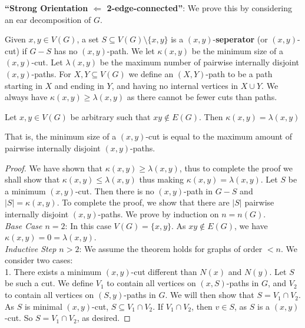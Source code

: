 \textbf{``Strong Orientation \(\Leftarrow\) 2-edge-connected''}: We prove this by considering an ear decomposition of $G$.

Given $x, y \in V(G)$, a set $S \subseteq V(G) \setminus \{x,y\}$ is a $(x,y)$-\textbf{seperator} (or $(x,y)$-cut) if $G-S$ has no $(x,y)$-path. We let $\kappa(x,y)$ be the minimum size of a $(x,y)$-cut. Let \(\lambda(x,y)\) be the maximum number of pairwise internally disjoint $(x,y)$-paths. For $X, Y \subseteq V(G)$ we define an $(X,Y)$-path to be a path starting in $X$ and ending in $Y$, and having no internal vertices in $X \cup Y$. We always have \(\kappa(x,y) \ge \lambda(x,y)\) as there cannot be fewer cuts than paths.

\begin{theorem}[Menger, 1927]
	Let $x,y \in V(G)$ be arbitrary such that $xy \notin E(G)$. Then \(\kappa(x,y) = \lambda(x,y)\)
\end{theorem}

That is, the minimum size of a $(x,y)$-cut is equal to the maximum amount of pairwise internally disjoint $(x,y)$-paths.

\begin{proof}
	We have shown that \(\kappa(x,y) \ge \lambda(x,y)\), thus to complete the proof we shall show that $\kappa(x,y) \le \lambda(x,y)$ thus making \(\kappa(x,y) = \lambda(x,y)\). Let $S$ be a minimum $(x,y)$-cut. Then there is no $(x,y)$-path in $G-S$ and $|S| = \kappa(x,y)$. To complete the proof, we show that there are $|S|$ pairwise internally disjoint $(x,y)$-paths. We prove by induction on $n = n(G)$.\\
	\noindent
	\textit{Base Case $n = 2$}: In this case $V(G) = \{x,y\}$. As $xy \notin E(G)$, we have $\kappa(x,y) = 0 = \lambda(x,y)$.\\
	\noindent
	\textit{Inductive Step $n > 2$}: We assume the theorem holds for graphs of order $< n$. We consider two cases:\\
	1. There exists  a minimum $(x,y)$-cut different than $N(x)$ and $N(y)$. Let $S$ be such a cut. We define $V_{1}$ to contain all vertices on $(x,S)$-paths in $G$, and $V_{2}$ to contain all vertices on $(S,y)$-paths in $G$. We will then show that $S = V_{1} \cap V_{2}$. As $S$ is minimal $(x,y)$-cut, $S \subseteq V_{1} \cap V_{2}$. If $V_{1} \cap V_{2}$, then $v \in S$, as $S$ is a $(x,y)$-cut. So $S = V_{1} \cap V_{2}$, as desired.
\end{proof}


